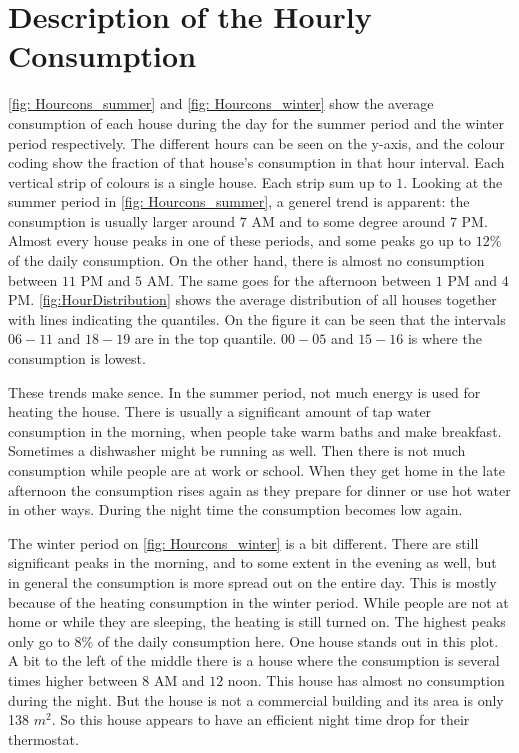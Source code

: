 \section{Description of the Hourly Consumption}
\noindent \cref{fig: Hourcons_summer} and \cref{fig: Hourcons_winter} show the average consumption of each house during the day for the summer period and the winter period respectively. The different hours can be seen on the y-axis, and the colour coding show the fraction of that house's consumption in that hour interval. Each vertical strip of colours is a single house. Each strip sum up to $1$. Looking at the summer period in \cref{fig: Hourcons_summer}, a generel trend is apparent: the consumption is usually larger around $7$ AM and to some degree around $7$ PM. Almost every house peaks in one of these periods, and some peaks go up to $12\%$ of the daily consumption. On the other hand, there is almost no consumption between $11$ PM and $5$ AM. The same goes for the afternoon between $1$ PM and $4$ PM. \cref{fig:HourDistribution} shows the average distribution of all houses together with lines indicating the quantiles. On the figure it can be seen that the intervals $06-11$ and $18-19$ are in the top quantile. $00-05$ and $15-16$ is where the consumption is lowest.

\noindent These trends make sence. In the summer period, not much energy is used for heating the house. There is usually a significant amount of tap water consumption in the morning, when people take warm baths and make breakfast. Sometimes a dishwasher might be running as well. Then there is not much consumption while people are at work or school. When they get home in the late afternoon the consumption rises again as they prepare for dinner or use hot water in other ways. During the night time the consumption becomes low again.



\noindent The winter period on \cref{fig: Hourcons_winter} is a bit different. There are still significant peaks in the morning, and to some extent in the evening as well, but in general the consumption is more spread out on the entire day. This is mostly because of the heating consumption in the winter period. While people are not at home or while they are sleeping, the heating is still turned on. The highest peaks only go to $8\%$ of the daily consumption here. One house stands out in this plot. A bit to the left of the middle there is a house where the consumption is several times higher between $8$ AM and $12$ noon. This house has almost no consumption during the night. But the house is not a commercial building and its area is only 138 $m^2$. So this house appears to have an efficient night time drop for their thermostat.



